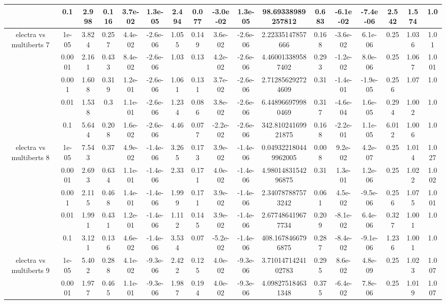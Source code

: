 \begin{tabular}{|c|c|c|c|c|c|c|c|c|c|c|c|c|c|c|c|c|}
 & 0.1 & 2.998 & 0.116 & 3.7e-02 & 1.3e-05 & 2.494 & 0.077 & -3.0e-02 & 1.3e-05 & 98.69338989257812 & 0.683 & -6.1e-02 & -7.4e-06 & 2.542 & 1.574 & 1.0 \\
\hline
\multirow{5}{*}{electra  vs multiberts 7} & 1e-05 & 3.824 & 0.257 & 4.4e-02 & -2.6e-06 & 1.055 & 0.149 & 3.6e-02 & -2.6e-06 & 2.22335147857666 & 0.168 & -3.6e-02 & 6.1e-06 & 0.25 & 1.036 & 1.01 \\
 & 0.0001 & 2.161 & 0.433 & 8.4e-02 & -2.6e-06 & 1.03 & 0.13 & 4.2e-02 & -2.6e-06 & 4.460013389587402 & 0.293 & -1.2e-02 & 8.0e-06 & 0.25 & 1.067 & 1.001 \\
 & 0.001 & 1.608 & 0.319 & 1.2e-01 & -2.6e-06 & 1.061 & 0.131 & 3.7e-02 & -2.6e-06 & 2.712856292724609 & 0.31 & -1.4e-01 & -1.9e-05 & 0.256 & 1.07 & 1.0 \\
 & 0.01 & 1.538 & 0.3 & 1.1e-01 & -2.6e-06 & 1.234 & 0.086 & 3.8e-02 & -2.6e-06 & 6.448966979980469 & 0.317 & -4.6e-04 & 1.6e-05 & 0.294 & 1.002 & 1.0 \\
 & 0.1 & 5.644 & 0.208 & 1.6e-02 & -2.6e-06 & 4.46 & 0.077 & -2.2e-02 & -2.6e-06 & 342.81024169921875 & 0.168 & -2.2e-01 & 1.1e-05 & 6.012 & 1.006 & 1.0 \\
\hline
\multirow{5}{*}{electra  vs multiberts 8} & 1e-05 & 7.543 & 0.37 & 4.9e-02 & -1.4e-06 & 3.265 & 0.173 & 3.9e-02 & -1.4e-06 & 0.049322180449962005 & 0.008 & 9.2e-02 & 4.2e-07 & 0.25 & 1.014 & 1.027 \\
 & 0.0001 & 2.693 & 0.634 & 1.1e-01 & -1.4e-06 & 2.33 & 0.171 & 4.0e-02 & -1.4e-06 & 4.9801483154296875 & 0.31 & 1.3e-01 & 1.2e-06 & 0.25 & 1.022 & 1.002 \\
 & 0.001 & 2.115 & 0.468 & 1.4e-01 & -1.4e-06 & 1.999 & 0.171 & 3.9e-02 & -1.4e-06 & 2.340787887573242 & 0.061 & 4.5e-02 & -9.5e-06 & 0.256 & 1.075 & 1.001 \\
 & 0.01 & 1.991 & 0.431 & 1.2e-01 & -1.4e-06 & 1.112 & 0.145 & 3.9e-02 & -1.4e-06 & 2.677486419677734 & 0.209 & -8.1e-02 & 6.4e-06 & 0.327 & 1.001 & 1.0 \\
 & 0.1 & 3.121 & 0.136 & 4.6e-02 & -1.4e-06 & 3.534 & 0.07 & -5.2e-02 & -1.4e-06 & 408.1678466796875 & 0.287 & -8.4e-02 & -9.1e-06 & 1.236 & 1.001 & 1.0 \\
\hline
\multirow{5}{*}{electra  vs multiberts 9} & 1e-05 & 5.402 & 0.288 & 4.1e-02 & -9.3e-06 & 2.422 & 0.125 & 4.0e-02 & -9.3e-06 & 3.7101471424102783 & 0.295 & 8.6e-02 & 4.8e-09 & 0.25 & 1.023 & 1.007 \\
 & 0.0001 & 1.977 & 0.465 & 1.1e-01 & -9.3e-06 & 1.987 & 0.194 & 4.0e-02 & -9.3e-06 & 4.098275184631348 & 0.375 & -6.4e-02 & 7.8e-06 & 0.25 & 1.019 & 1.007 \\

\end{tabular}
